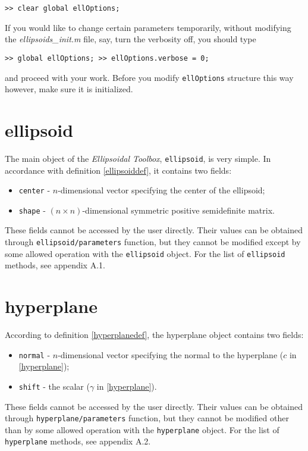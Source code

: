 {\tt >> clear global ellOptions;}

If you would like to change certain parameters temporarily, without
modifying the {\it ellipsoids\_init.m} file, say, turn the verbosity off,
you should type

{\tt >> global ellOptions;
\newline
>> ellOptions.verbose = 0;}

and proceed with your work. Before you modify {\tt ellOptions} structure
this way however, make sure it is initialized.



\section{ellipsoid}
The main object of the {\it Ellipsoidal Toolbox}, {\tt ellipsoid}, is
very simple. In accordance with definition \ref{ellipsoiddef}, it contains
two fields:
\begin{itemize}
\item {\tt center} - $n$-dimensional vector specifying the center
of the ellipsoid;
\item {\tt shape} - $(n\times n)$-dimensional symmetric positive
semidefinite matrix.
\end{itemize}
These fields cannot be accessed by the user directly. Their values
can be obtained through {\tt ellipsoid/parameters} function, but they cannot
be modified except by some allowed operation with the {\tt ellipsoid}
object. For the list of {\tt ellipsoid} methods, see appendix A.1.



\section{hyperplane}
According to  definition \ref{hyperplanedef}, the hyperplane object
contains two fields:
\begin{itemize}
\item {\tt normal} - $n$-dimensional vector specifying the normal to
the hyperplane ($c$ in \ref{hyperplane});
\item {\tt shift} - the scalar ($\gamma$ in \ref{hyperplane}).
\end{itemize}
These fields cannot be accessed by the user directly. Their values
can be obtained through {\tt hyperplane/parameters} function, but they cannot
be modified other than by some allowed operation with the {\tt hyperplane}
object. For the list of {\tt hyperplane} methods, see appendix A.2.

